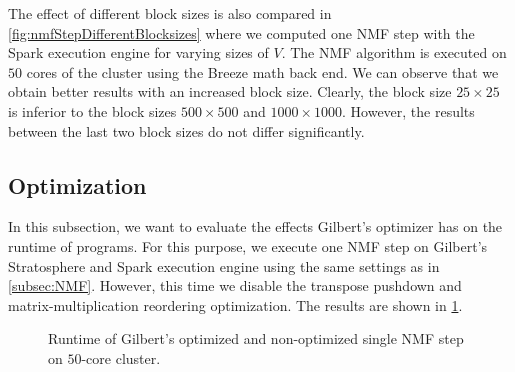 The effect of different block sizes is also compared in \cref{fig:nmfStepDifferentBlocksizes} where we computed one NMF step with the Spark execution engine for varying sizes of $V$.
The NMF algorithm is executed on $50$ cores of the cluster using the Breeze math back end.
We can observe that we obtain better results with an increased block size.
Clearly, the block size $25 \times 25$ is inferior to the block sizes $500\times 500$ and $1000\times 1000$.
However, the results between the last two block sizes do not differ significantly.

\subsection{Optimization}

In this subsection, we want to evaluate the effects Gilbert's optimizer has on the runtime of programs.
For this purpose, we execute one NMF step on Gilbert's Stratosphere and Spark execution engine using the same settings as in \cref{subsec:NMF}.
However, this time we disable the transpose pushdown and matrix-multiplication reordering optimization.
The results are shown in \cref{fig:nnmfLoadOptimization}.

\begin{figure}
	\centering
	\caption{Runtime of Gilbert's optimized and non-optimized single NMF step on $50$-core cluster.}
	\label{fig:nnmfLoadOptimization}
\end{figure}

